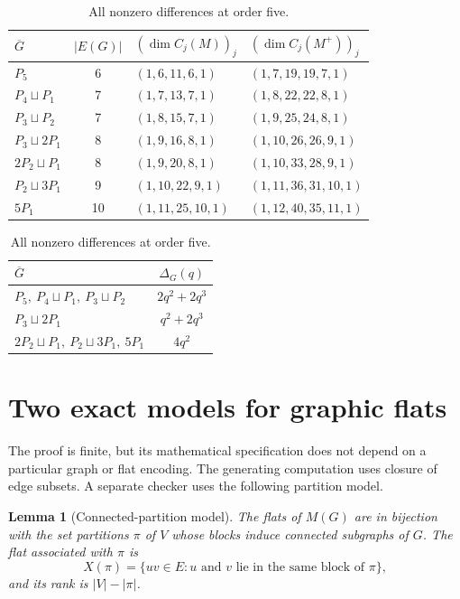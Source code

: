 \documentclass[11pt]{article}
\newtheorem{lemma}[theorem]{Lemma}
\theoremstyle{remark}
\begin{document}
\begin{table}[htbp]
\centering
\small
\begin{tabular}{@{}lcll@{}}
\toprule
$\overline G$ & $|E(G)|$ & $(\dim C_j(M))_j$ &
  $(\dim C_j(M^+))_j$ \\
\midrule
$P_5$                  & 6  & $(1,6,11,6,1)$ & $(1,7,19,19,7,1)$ \\
$P_4\sqcup P_1$        & 7  & $(1,7,13,7,1)$ & $(1,8,22,22,8,1)$ \\
$P_3\sqcup P_2$        & 7  & $(1,8,15,7,1)$ & $(1,9,25,24,8,1)$ \\
$P_3\sqcup2P_1$        & 8  & $(1,9,16,8,1)$ & $(1,10,26,26,9,1)$ \\
$2P_2\sqcup P_1$       & 8  & $(1,9,20,8,1)$ & $(1,10,33,28,9,1)$ \\
$P_2\sqcup3P_1$        & 9  & $(1,10,22,9,1)$ & $(1,11,36,31,10,1)$ \\
$5P_1$                  & 10 & $(1,11,25,10,1)$ & $(1,12,40,35,11,1)$ \\
\bottomrule
\end{tabular}

\medskip
\begin{tabular}{@{}lc@{}}
\toprule
$\overline G$ & $\Delta_G(q)$ \\
\midrule
$P_5,\ P_4\sqcup P_1,\ P_3\sqcup P_2$ & $2q^2+2q^3$ \\
$P_3\sqcup2P_1$                         & $q^2+2q^3$ \\
$2P_2\sqcup P_1,\ P_2\sqcup3P_1,\ 5P_1$ & $4q^2$ \\
\bottomrule
\end{tabular}
\caption{All nonzero differences at order five.}
\label{tab:nonzero}
\end{table}
\section{Two exact models for graphic flats}

The proof is finite, but its mathematical specification does not depend on a
particular graph or flat encoding.  The generating computation uses closure
of edge subsets.  A separate checker uses the following partition model.

\begin{lemma}[Connected-partition model]
\label{lem:partition}
The flats of $M(G)$ are in bijection with the set partitions $\pi$ of $V$
whose blocks induce connected subgraphs of $G$.  The flat associated with
$\pi$ is
\[
 X(\pi)=\{uv\in E:u\text{ and }v\text{ lie in the same block of }\pi\},
\]
and its rank is $|V|-|\pi|$.
\end{lemma}
\end{document}
